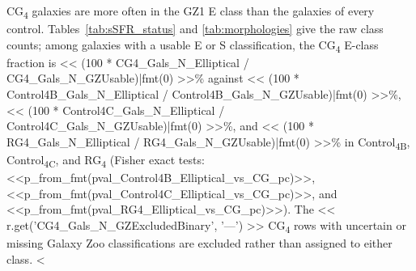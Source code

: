 \documentclass{aa}
\newcommand{\CB}{Control\textsubscript{4B}}
\newcommand{\CC}{Control\textsubscript{4C}}
\newcommand{\CG}{CG\textsubscript{4}}
\newcommand{\RG}{RG\textsubscript{4}}
\begin{document}
\CG{} galaxies are more often in the GZ1 E class than the galaxies of every control. Tables~\ref{tab:sSFR_status} and \ref{tab:morphologies} give the raw class counts; among galaxies with a usable E or S classification, the \CG{} E-class fraction is << (100 * CG4_Gals_N_Elliptical / CG4_Gals_N_GZUsable)|fmt(0) >>\% against << (100 * Control4B_Gals_N_Elliptical / Control4B_Gals_N_GZUsable)|fmt(0) >>\%, << (100 * Control4C_Gals_N_Elliptical / Control4C_Gals_N_GZUsable)|fmt(0) >>\%, and << (100 * RG4_Gals_N_Elliptical / RG4_Gals_N_GZUsable)|fmt(0) >>\% in \CB{}, \CC{}, and \RG{} (Fisher exact tests: <<p_from_fmt(pval_Control4B_Elliptical_vs_CG_pc)>>, <<p_from_fmt(pval_Control4C_Elliptical_vs_CG_pc)>>, and <<p_from_fmt(pval_RG4_Elliptical_vs_CG_pc)>>). The << r.get('CG4_Gals_N_GZExcludedBinary', '---') >> \CG{} rows with uncertain or missing Galaxy Zoo classifications are excluded rather than assigned to either class. <%
\end{document}
